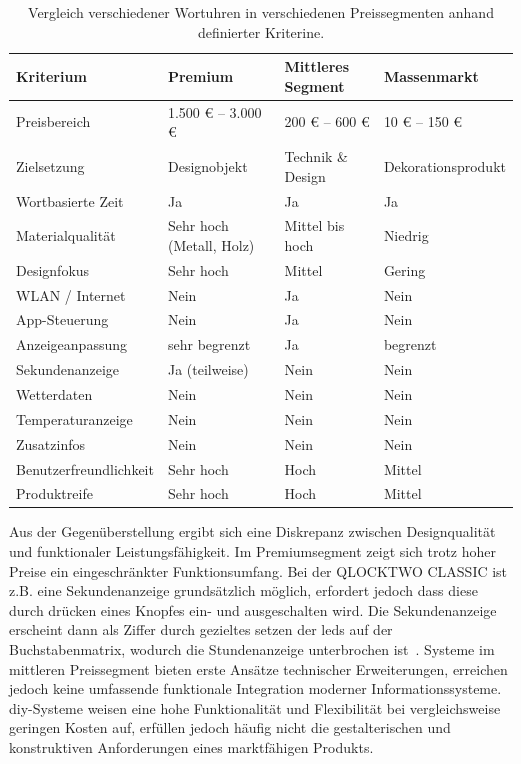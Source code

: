 \begin{table}[H]
\centering
\begin{tabular}{|p{4cm}|p{3.5cm}|p{3.5cm}|p{3.5cm}|}
\hline
\textbf{Kriterium} & \textbf{Premium} & \textbf{Mittleres Segment} & \textbf{Massenmarkt} \\
\hline
Preisbereich & 1.500 € – 3.000 € & 200 € – 600 € & 10 € – 150 € \\
\hline
Zielsetzung & Designobjekt & Technik \& Design & Dekorationsprodukt \\
\hline
Wortbasierte Zeit & Ja & Ja & Ja \\
\hline
Materialqualität & Sehr hoch (Metall, Holz) & Mittel bis hoch & Niedrig \\
\hline
Designfokus & Sehr hoch & Mittel & Gering \\
\hline
WLAN / Internet & Nein & Ja & Nein \\
\hline
App-Steuerung & Nein & Ja & Nein \\
\hline
Anzeigeanpassung & sehr begrenzt & Ja & begrenzt \\
\hline
Sekundenanzeige & Ja (teilweise) & Nein & Nein \\
\hline
Wetterdaten & Nein & Nein & Nein \\
\hline
Temperaturanzeige & Nein & Nein & Nein \\
\hline
Zusatzinfos & Nein & Nein & Nein \\
\hline
Benutzerfreundlichkeit & Sehr hoch & Hoch & Mittel \\
\hline
Produktreife & Sehr hoch & Hoch & Mittel \\
\hline
\end{tabular}
\caption{Vergleich verschiedener Wortuhren in verschiedenen Preissegmenten anhand definierter Kriterine.}
\label{tab:vergleich_wordclock_ohne_diy}
\end{table}

Aus der Gegenüberstellung ergibt sich eine Diskrepanz zwischen Designqualität und funktionaler Leistungsfähigkeit. 
Im Premiumsegment zeigt sich trotz hoher Preise ein eingeschränkter Funktionsumfang.
Bei der QLOCKTWO CLASSIC ist z.B. eine Sekundenanzeige grundsätzlich möglich, erfordert jedoch dass diese durch drücken eines Knopfes ein- und ausgeschalten wird.
Die Sekundenanzeige erscheint dann als Ziffer durch gezieltes setzen der \gls{led}s auf der Buchstabenmatrix, wodurch die Stundenanzeige unterbrochen ist~\cite{QlockTwoClassicSekundenanzeige}. 
Systeme im mittleren Preissegment bieten erste Ansätze technischer Erweiterungen, erreichen jedoch keine umfassende funktionale Integration moderner Informationssysteme. 
\gls{diy}-Systeme weisen eine hohe Funktionalität und Flexibilität bei vergleichsweise geringen Kosten auf, erfüllen jedoch häufig nicht die gestalterischen und konstruktiven Anforderungen eines marktfähigen Produkts.

